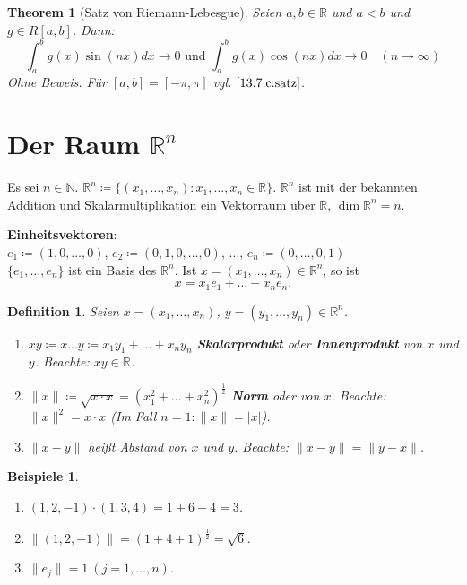\documentclass[14pt,titlepage,ngerman,a4paper,headsepline,DIV15,halfparskip*]{scrartcl}
\newcommand{\N}{\mathbb{N}}
\newcommand{\R}{\mathbb{R}}
\theoremstyle{named}
\newtheorem{namedtheorem}{Theorem} \counterwithin{namedtheorem}{section}
\theoremstyle{dotless}
\newtheorem*{beispiele}{Beispiele}
\newtheorem*{definition}{Definition}
\begin{document}
\begin{namedtheorem}[Satz von Riemann-Lebesgue] \label{13.8:prop-SatzVonRiemann-Lebesgue}
	Seien $a, b \in \R$ und $a < b$ und $g \in R[a, b]$. Dann:
		$$ \int_{a}^{b} g(x) \sin(nx) dx \rightarrow 0 \text{ und } \int_{a}^{b} g(x) \cos(nx) dx \rightarrow 0 \quad (n \rightarrow \infty) $$
		Ohne Beweis. Für $[a, b] = [-\pi, \pi]$ vgl. $\ref{13.7.c:satz}$.
\end{namedtheorem}

\newpage

\section{Der Raum $\R^{n}$}

Es sei $n \in \N$. $\R^{n} \coloneqq \{ (x_{1}, \dotsc, x_{n}) : x_{1}, \dotsc, x_{n} \in \R \}$. $\R^{n}$ ist mit der bekannten Addition und Skalarmultiplikation ein Vektorraum über $\R$, $\dim \R^{n} = n$.

\textbf{Einheitsvektoren}: \\
$e_{1} \coloneqq (1, 0, \dotsc, 0)$, $e_{2} \coloneqq (0, 1, 0, \dotsc, 0)$, $\dotsc$, $e_{n} \coloneqq (0, \dotsc, 0, 1)$ \\
$\{ e_{1}, \dotsc, e_{n} \}$ ist ein Basis des $\R^{n}$. Ist $x = (x_{1}, \dotsc, x_{n}) \in \R^{n}$, so ist
$$ x = x_{1} e_{1} + \dotsc + x_{n} e_{n}. $$

   
\begin{definition}
	Seien $x = (x_{1}, \dotsc, x_{n})$, $y = (y_{1}, \dotsc, y_{n}) \in \R^{n}$.
	\begin{enumerate}
		\item $xy \coloneqq x \dotsc y \coloneqq x_{1} y_{1} + \dotsc + x_{n} y_{n}$ \textbf{Skalarprodukt} oder \textbf{Innenprodukt} von $x$ und $y$. Beachte: $xy \in \R$.
		\item $\| x \| \coloneqq \sqrt{x \cdot x} = (x_{1}^{2} + \dotsc + x_{n}^{2})^{\frac{1}{2}}$ \textbf{Norm} oder  von $x$. Beachte: $\|x\|^{2} = x \cdot x$ (Im Fall $n = 1: \|x\| = |x|$).
		\item $\| x - y \|$ hei{\ss}t Abstand von $x$ und $y$. Beachte: $\| x - y \| = \| y - x \|$.
	\end{enumerate}
\end{definition}


\begin{beispiele} ~\
	\begin{enumerate}
		\item $(1, 2, -1) \cdot (1, 3, 4) = 1 + 6 - 4 = 3$.
		\item $\| (1, 2, -1) \| = (1 + 4 + 1)^{\frac{1}{2}} = \sqrt{6}$.
		\item $\| e_{j} \| = 1 ~(j = 1, \dotsc, n)$.
	\end{enumerate}
\end{beispiele}
\end{document}
